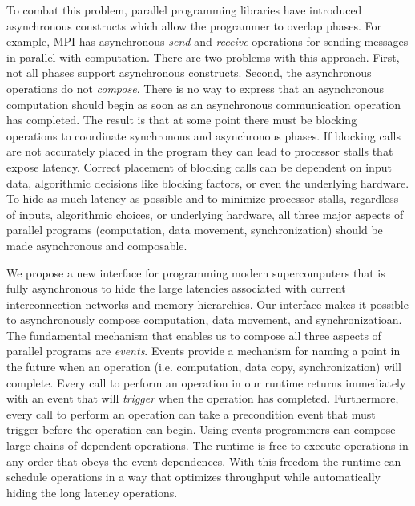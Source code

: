 To combat this problem, parallel programming libraries have introduced
asynchronous constructs which allow the programmer to overlap phases.  For example,
MPI has asynchronous {\em send} and {\em receive} operations for sending
messages in parallel with computation.  There are two problems with this approach.
First, not all phases support asynchronous constructs.  Second,
the asynchronous operations do not {\em compose}.  There is no way to express
that an asynchronous computation should begin as soon as an asynchronous
communication operation has completed.  The result is that
at some point there must be blocking operations to coordinate synchronous
and asynchronous phases.  If blocking calls are not accurately placed in the
program they can lead to processor stalls that expose latency.  Correct
placement of blocking calls can be dependent on input data, algorithmic decisions like blocking
factors, or even the underlying hardware.  
To hide as much latency as possible and to minimize processor stalls, regardless
of inputs, algorithmic choices, or underlying hardware,
all three major aspects of parallel programs (computation, data movement, synchronization)
should be made asynchronous and composable.

We propose a new interface for programming modern supercomputers 
that is fully asynchronous to hide the large latencies associated with current 
interconnection networks and memory hierarchies.  Our interface makes it possible
to asynchronously compose computation, data movement, and synchronizatioan.  The 
fundamental mechanism that enables us to compose all three aspects of parallel
programs are {\em events}.  Events provide a mechanism for naming a point in the future
when an operation (i.e. computation, data copy, synchronization) will complete.  
Every call to perform an operation in our runtime returns immediately with an event that will 
{\em trigger} when the operation has completed.  Furthermore, every call
to perform an operation can take a precondition event that must trigger before
the operation can begin.  Using events programmers can compose large
chains of dependent operations.  The runtime is free to execute operations
in any order that obeys the event dependences.  With this freedom the
runtime can schedule operations in a way that optimizes throughput
while automatically hiding the long latency operations.

